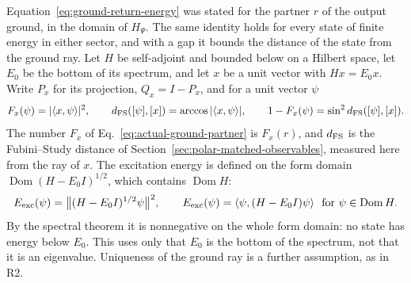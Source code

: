 \documentclass[11pt]{article}
\theoremstyle{definition}
\begin{document}
Equation~\eqref{eq:ground-return-energy} was stated for the partner $r$ of the output ground, in the domain of $H_\Psi$. The same identity holds for every state of finite energy in either sector, and with a gap it bounds the distance of the state from the ground ray. Let $H$ be self-adjoint and bounded below on a Hilbert space, let $E_0$ be the bottom of its spectrum, and let $x$ be a unit vector with $Hx=E_0x$. Write $P_x$ for its projection, $Q_x=I-P_x$, and for a unit vector $\psi$
\begin{equation}
 F_x(\psi)=|\langle x,\psi\rangle|^2,\qquad
 d_{\rm FS}([\psi],[x])=\arccos|\langle x,\psi\rangle|,\qquad
 1-F_x(\psi)=\sin^2d_{\rm FS}([\psi],[x]).
 \label{eq:fidelity-energy-distance}
\end{equation}
The number $F_x$ of Eq.~\eqref{eq:actual-ground-partner} is $F_x(r)$, and $d_{\rm FS}$ is the Fubini--Study distance of Section~\ref{sec:polar-matched-observables}, measured here from the ray of $x$. The excitation energy is defined on the form domain $\operatorname{Dom}(H-E_0I)^{1/2}$, which contains $\operatorname{Dom}H$:
\begin{equation}
 E_{\rm exc}(\psi)=\bigl\|(H-E_0I)^{1/2}\psi\bigr\|^2,
 \qquad E_{\rm exc}(\psi)=\langle\psi,(H-E_0I)\psi\rangle\ \text{ for }\psi\in\operatorname{Dom}H .
 \label{eq:fidelity-energy-form}
\end{equation}
By the spectral theorem it is nonnegative on the whole form domain: no state has energy below $E_0$. This uses only that $E_0$ is the bottom of the spectrum, not that it is an eigenvalue. Uniqueness of the ground ray is a further assumption, as in R2.
\end{document}
